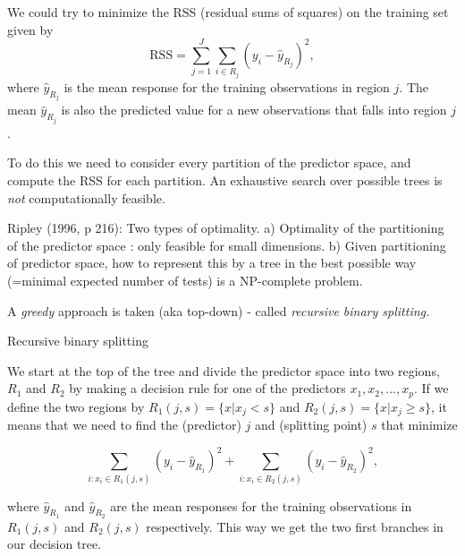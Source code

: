\documentclass[ignorenonframetext,]{beamer}
\begin{document}
\begin{frame}

We could try to minimize the RSS (residual sums of squares) on the
training set given by \[
\text{RSS}=\sum_{j=1}^J \sum_{i \in R_j}(y_i-\hat{y}_{R_j})^2,
\] where \(\hat{y}_{R_j}\) is the mean response for the training
observations in region \(j\). The mean \(\hat{y}_{R_j}\) is also the
predicted value for a new observations that falls into region \(j\).

To do this we need to consider every partition of the predictor space,
and compute the RSS for each partition. An exhaustive search over
possible trees is \emph{not} computationally feasible.

\end{frame}

\begin{frame}

Ripley (1996, p 216): Two types of optimality. a) Optimality of the
partitioning of the predictor space : only feasible for small
dimensions. b) Given partitioning of predictor space, how to represent
this by a tree in the best possible way (=minimal expected number of
tests) is a NP-complete problem.

A \emph{greedy} approach is taken (aka top-down) - called
\emph{recursive binary splitting.}

\end{frame}

\begin{frame}

\begin{block}{Recursive binary splitting}

We start at the top of the tree and divide the predictor space into two
regions, \(R_1\) and \(R_2\) by making a decision rule for one of the
predictors \(x_1, x_2,...,x_p\). If we define the two regions by
\(R_1(j,s)=\{x|x_j<s\}\) and \(R_2(j,s)=\{x|x_j\geq s\}\), it means that
we need to find the (predictor) \(j\) and (splitting point) \(s\) that
minimize

\[\sum_{i: x_i \in R_1(j,s)}(y_i-\hat{y}_{R_1})^2+\sum_{i: x_i \in R_2(j,s)}(y_i -\hat{y}_{R_2})^2,\]

where \(\hat{y}_{R_1}\) and \(\hat{y}_{R_2}\) are the mean responses for
the training observations in \(R_1(j,s)\) and \(R_2(j,s)\) respectively.
This way we get the two first branches in our decision tree.

\end{block}

\end{frame}
\end{document}
